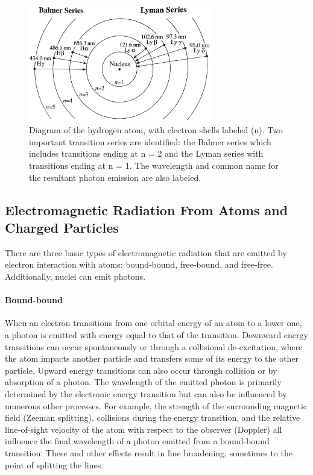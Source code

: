 \begin{figure}[!h]
    \begin{center}
	    \includegraphics[width=80mm]{Images/HydrogenTransitions.png}
    \end{center}
    \caption[Atomic transitions for Balmer and Lyman series]{
        Diagram of the hydrogen atom, with electron shells labeled (n). Two important transition series are 
        identified: the Balmer series which includes transitions ending at n = 2 and the Lyman series with 
        transitions ending at n = 1. The wavelength and common name for the resultant photon emission are also labeled. 
    }
    \label{fig:balmerandlyman}
\end{figure}

\subsection{Electromagnetic Radiation From Atoms and Charged Particles}
There are three basic types of electromagnetic radiation that are emitted by electron interaction with atoms: bound-bound, free-bound, and free-free. Additionally, nuclei can emit photons. 

\paragraph{Bound-bound}
When an electron transitions from one orbital energy of an atom to a lower one, a photon is emitted with energy equal to that of the transition. Downward energy transitions can occur spontaneously or through a collisional de-excitation, where the atom impacts another particle and transfers some of its energy to the other particle. Upward energy transitions can also occur through collision or by absorption of a photon. The wavelength of the emitted photon is primarily determined by the electronic energy transition but can also be influenced by numerous other processes. For example, the strength of the surrounding magnetic field (Zeeman splitting), collisions during the energy transition, and the relative line-of-sight velocity of the atom with respect to the observer (Doppler) all influence the final wavelength of a photon emitted from a bound-bound transition. These and other effects result in line broadening, sometimes to the point of splitting the lines. 

